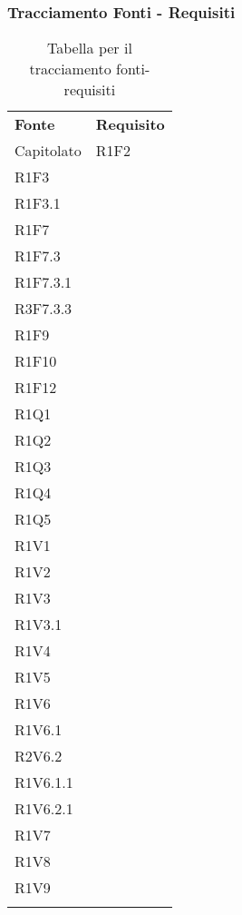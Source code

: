 \subsubsection{Tracciamento Fonti - Requisiti}

\renewcommand{\arraystretch}{2.2}

\begin{longtable}{|C{6.5cm}|C{6.5cm}|}
	
	\caption{Tabella per il tracciamento fonti-requisiti}\\
	\hline
	
	\textbf{Fonte} & \textbf{Requisito} 
	\tabularnewline
	\endfirsthead
	
	Capitolato &  
	\centering
	R1F2\\
	R1F3 \\
	R1F3.1\\
	R1F7\\
	R1F7.3\\
	R1F7.3.1\\
	R3F7.3.3\\
	R1F9\\
	R1F10\\
	R1F12\\
	R1Q1\\
	R1Q2\\
	R1Q3\\
	R1Q4\\
	R1Q5\\
	R1V1\\
	R1V2\\
	R1V3\\
	R1V3.1\\
	R1V4\\
	R1V5\\
	R1V6\\
	R1V6.1\\
	R2V6.2\\
	R1V6.1.1\\
	R1V6.2.1\\
	R1V7\\
	R1V8\\
	R1V9\\
	
	\tabularnewline
	

\end{longtable}
